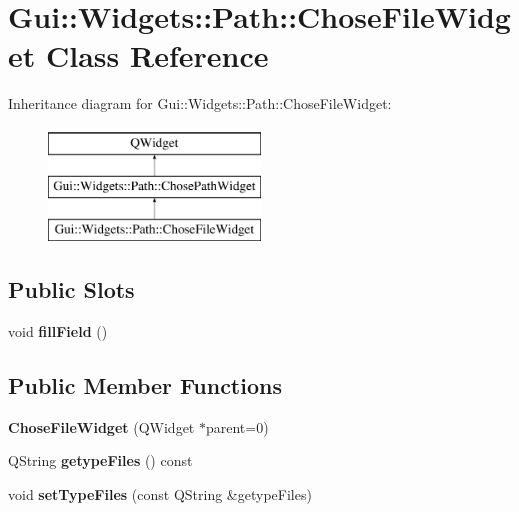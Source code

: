 \hypertarget{classGui_1_1Widgets_1_1Path_1_1ChoseFileWidget}{\section{Gui\-:\-:Widgets\-:\-:Path\-:\-:Chose\-File\-Widget Class Reference}
\label{classGui_1_1Widgets_1_1Path_1_1ChoseFileWidget}
}
Inheritance diagram for Gui\-:\-:Widgets\-:\-:Path\-:\-:Chose\-File\-Widget\-:\begin{figure}[H]
\begin{center}
\leavevmode
\includegraphics[height=3.000000cm]{da/d61/classGui_1_1Widgets_1_1Path_1_1ChoseFileWidget}
\end{center}
\end{figure}
\subsection*{Public Slots}
\begin{DoxyCompactItemize}
\item 
\hypertarget{classGui_1_1Widgets_1_1Path_1_1ChoseFileWidget_af3ec8425f422362a1f4699b0cd554113}{void {\bfseries fill\-Field} ()}\label{classGui_1_1Widgets_1_1Path_1_1ChoseFileWidget_af3ec8425f422362a1f4699b0cd554113}

\end{DoxyCompactItemize}
\subsection*{Public Member Functions}
\begin{DoxyCompactItemize}
\item 
\hypertarget{classGui_1_1Widgets_1_1Path_1_1ChoseFileWidget_a6d1c9a76bc56c345c6702feb9d5c668e}{{\bfseries Chose\-File\-Widget} (Q\-Widget $\ast$parent=0)}\label{classGui_1_1Widgets_1_1Path_1_1ChoseFileWidget_a6d1c9a76bc56c345c6702feb9d5c668e}

\item 
\hypertarget{classGui_1_1Widgets_1_1Path_1_1ChoseFileWidget_a69fb84fdf1c4db5c544d6cc88a7e55bf}{Q\-String {\bfseries getype\-Files} () const }\label{classGui_1_1Widgets_1_1Path_1_1ChoseFileWidget_a69fb84fdf1c4db5c544d6cc88a7e55bf}

\item 
\hypertarget{classGui_1_1Widgets_1_1Path_1_1ChoseFileWidget_a668dfb8a8197a0d82632d85010ae5748}{void {\bfseries set\-Type\-Files} (const Q\-String \&getype\-Files)}\label{classGui_1_1Widgets_1_1Path_1_1ChoseFileWidget_a668dfb8a8197a0d82632d85010ae5748}

\end{DoxyCompactItemize}

